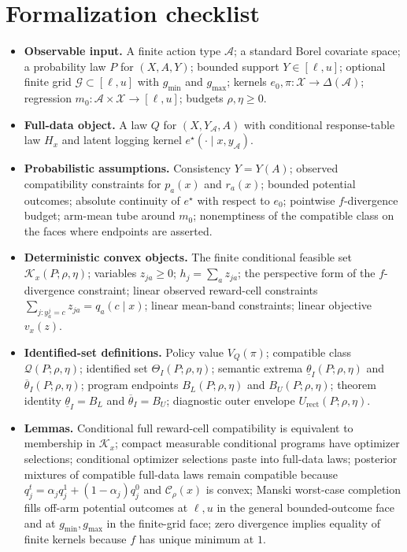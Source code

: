 \documentclass[11pt]{article}
\theoremstyle{definition}
\theoremstyle{plain}
\theoremstyle{remark}
\begin{document}
\section{Formalization checklist}
\begin{itemize}[leftmargin=*]
\item \textbf{Observable input.}  A finite action type $\mathcal A$; a standard
Borel covariate space; a probability law $P$ for $(X,A,Y)$; bounded support
$Y\in[\ell,u]$; optional finite grid $\mathcal G\subset[\ell,u]$ with
$g_{\min}$ and $g_{\max}$; kernels
$e_0,\pi:\mathcal X\to\Delta(\mathcal A)$; regression
$m_0:\mathcal A\times\mathcal X\to[\ell,u]$; budgets $\rho,\eta\ge0$.

\item \textbf{Full-data object.}  A law $Q$ for
$(X,Y_{\mathcal A},A)$ with conditional response-table law $H_x$ and latent
logging kernel $e^\star(\cdot\mid x,y_{\mathcal A})$.

\item \textbf{Probabilistic assumptions.}  Consistency $Y=Y(A)$; observed
compatibility constraints for $p_a(x)$ and $r_a(x)$; bounded potential outcomes;
absolute continuity of $e^\star$ with respect to $e_0$; pointwise
$f$-divergence budget; arm-mean tube around $m_0$; nonemptiness of the
compatible class on the faces where endpoints are asserted.

\item \textbf{Deterministic convex objects.}  The finite conditional feasible
set $\mathcal K_x(P;\rho,\eta)$; variables $z_{ja}\ge0$;
$h_j=\sum_a z_{ja}$; the perspective form of the $f$-divergence constraint;
linear observed reward-cell constraints
$\sum_{j:y^j_a=c}z_{ja}=q_a(c\mid x)$; linear mean-band constraints; linear
objective $v_x(z)$.

\item \textbf{Identified-set definitions.}  Policy value
$V_Q(\pi)$; compatible class $\mathcal Q(P;\rho,\eta)$; identified set
$\Theta_I(P;\rho,\eta)$; semantic extrema
$\underline{\theta}_I(P;\rho,\eta)$ and $\overline{\theta}_I(P;\rho,\eta)$; program
endpoints $B_L(P;\rho,\eta)$ and $B_U(P;\rho,\eta)$; theorem identity
$\underline{\theta}_I=B_L$ and $\overline{\theta}_I=B_U$; diagnostic outer envelope
$U_{\mathrm{rect}}(P;\rho,\eta)$.

\item \textbf{Lemmas.}  Conditional full reward-cell compatibility is
equivalent to membership in $\mathcal K_x$; compact measurable conditional
programs have optimizer selections; conditional optimizer selections paste into
full-data laws; posterior mixtures of compatible full-data laws remain
compatible because $q_j^t=\alpha_jq_j^1+(1-\alpha_j)q_j^0$ and
$\mathcal C_\rho(x)$ is convex; Manski worst-case completion fills off-arm
potential outcomes at $\ell,u$ in the general bounded-outcome face and at
$g_{\min},g_{\max}$ in the finite-grid face; zero divergence implies equality
of finite kernels because $f$ has unique minimum at $1$.


\end{itemize}
\end{document}
